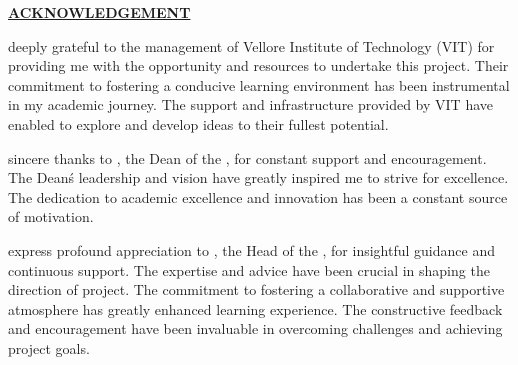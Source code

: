 \addtocounter{page}{-1}
\begin{center}
	\Large{\textbf{\underline{ACKNOWLEDGEMENT}}}	
\end{center}
\vspace{1em}
\normalsize
\begin{justify}
	\setlength{\parindent}{1cm}\indent {}    deeply grateful to the management of Vellore Institute of Technology (VIT) for providing me with the opportunity and resources to undertake this project. Their commitment to fostering a conducive learning environment has been instrumental in my academic journey. The support and infrastructure provided by VIT have enabled  to explore and develop  ideas to their fullest potential.
\end{justify}
\begin{justify}
	\setlength{\parindent}{1cm}\indent {} sincere thanks to \deanname, the Dean of the \schoolname, for constant  support and encouragement. The Dean\'s leadership and vision have greatly inspired me to strive for excellence. The  dedication to academic excellence and innovation has been a constant source of motivation.
\end{justify}
\begin{justify}
	\setlength{\parindent}{1cm}\indent {} express  profound appreciation to {\hodname}, the Head of the {\hoddept}, for  insightful guidance and continuous support. The expertise and advice have been crucial in shaping the direction of  project. The commitment to fostering a collaborative and supportive atmosphere has greatly enhanced  learning experience. The constructive feedback and encouragement have been invaluable in overcoming challenges and achieving  project goals.
\end{justify}
